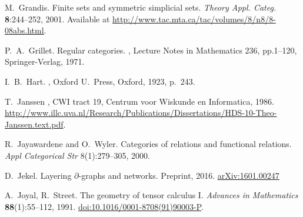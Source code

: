 \begin{thebibliography}{RSW00}
    M.\ Grandis.
    \newblock Finite sets and symmetric simplicial sets.
    \newblock \textsl{Theory Appl. Categ.} {\bf 8}:244--252, 2001.
    \newblock Available at
    \href{http://www.tac.mta.ca/tac/volumes/8/n8/8-08abs.html}
    {http://www.tac.mta.ca/tac/volumes/8/n8/8-08abs.html}.

    P.\ A.\ Grillet.
    \newblock Regular categories.
    , Lecture Notes in
    Mathematics 236, pp.1--120, Springer-Verlag, 1971.


    I.\ B.\ Hart.
    , Oxford U.\ Press,
    Oxford, 1923, p.\ 243.

    
    
    T.\ Janssen
    , CWI tract 19, Centrum voor
    Wiskunde en Informatica, 1986.
    \newblock
    \href{http://www.illc.uva.nl/Research/Publications/Dissertations/HDS-10-Theo-Janssen.text.pdf}{http://www.illc.uva.nl/Research/Publications/Dissertations/HDS-10-Theo-Janssen.text.pdf}.
    
    R.\ Jayawardene and O.\ Wyler.
    \newblock Categories of relations and functional relations.
    \newblock \emph{Appl Categorical Str} 8(1):279--305, 2000.
    
    D.\ Jekel.
    \newblock Layering $\partial$-graphs and networks. 
    \newblock Preprint, 2016.
    \newblock \href{http://arxiv.org/abs/1601.00247}{arXiv:1601.00247}

    A.\ Joyal, R.\ Street.
    \newblock The geometry of tensor calculus I.
    \newblock \emph{Advances in Mathematics} {\bf 88}(1):55--112, 1991.
    \newblock \href{http://doi.org/10.1016/0001-8708(91)90003-P}{doi:10.1016/0001-8708(91)90003-P}.


\end{thebibliography}
